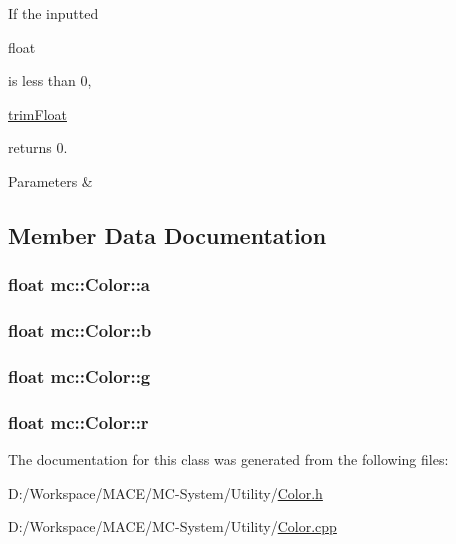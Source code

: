 If the inputted
\begin{DoxyCode}
\textcolor{keywordtype}{float} 
\end{DoxyCode}
 is less than 0,
\begin{DoxyCode}
\hyperlink{classmc_1_1_color_a8fda0b1f0e31bab9ea9a576af292ffe7}{trimFloat} 
\end{DoxyCode}
 returns 0.


\begin{DoxyParams}{Parameters}
{\em } & \\
\hline
\end{DoxyParams}


\subsection{Member Data Documentation}
\subsubsection[{\texorpdfstring{a}{a}}]{\setlength{\rightskip}{0pt plus 5cm}float mc\+::\+Color\+::a}\hypertarget{classmc_1_1_color_a6d83e513538a31ebb79a310bb3249548}{}\label{classmc_1_1_color_a6d83e513538a31ebb79a310bb3249548}
\subsubsection[{\texorpdfstring{b}{b}}]{\setlength{\rightskip}{0pt plus 5cm}float mc\+::\+Color\+::b}\hypertarget{classmc_1_1_color_afd537e7822ea1674f3f66db22b343ec0}{}\label{classmc_1_1_color_afd537e7822ea1674f3f66db22b343ec0}
\subsubsection[{\texorpdfstring{g}{g}}]{\setlength{\rightskip}{0pt plus 5cm}float mc\+::\+Color\+::g}\hypertarget{classmc_1_1_color_a16c106a491d5ab2deef17a0a5f4c0a95}{}\label{classmc_1_1_color_a16c106a491d5ab2deef17a0a5f4c0a95}
\subsubsection[{\texorpdfstring{r}{r}}]{\setlength{\rightskip}{0pt plus 5cm}float mc\+::\+Color\+::r}\hypertarget{classmc_1_1_color_a21e476d9238f36f210f5cd35868b3d08}{}\label{classmc_1_1_color_a21e476d9238f36f210f5cd35868b3d08}


The documentation for this class was generated from the following files\+:\begin{DoxyCompactItemize}
\item 
D\+:/\+Workspace/\+M\+A\+C\+E/\+M\+C-\/\+System/\+Utility/\hyperlink{_color_8h}{Color.\+h}\item 
D\+:/\+Workspace/\+M\+A\+C\+E/\+M\+C-\/\+System/\+Utility/\hyperlink{_color_8cpp}{Color.\+cpp}\end{DoxyCompactItemize}
